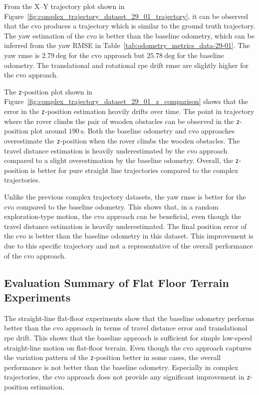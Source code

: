 \documentclass[report.tex]{subfiles}
\begin{document}
    From the X--Y trajectory plot shown in Figure~\ref{fig:complex_trajectory_dataset_29_01_trajectory}, it can be observed that the \gls{cvo} produces a trajectory which is similar to the ground truth trajectory. The yaw estimation of the \gls{cvo} is better than the baseline odometry, which can be inferred from the yaw RMSE in Table~\ref{tab:odometry_metrics_data-29-01}. The yaw \gls{rmse} is $2.79~\mathrm{deg}$ for the \gls{cvo} approach but $25.78~\mathrm{deg}$ for the baseline odometry. The translational and rotational \gls{rpe} drift \gls{rmse} are slightly higher for the \gls{cvo} approach.

    The \texttt{z}-position plot shown in Figure~\ref{fig:complex_trajectory_dataset_29_01_z_comparison} shows that the error in the \texttt{z}-position estimation heavily drifts over time. The point in trajectory where the rover climbs the pair of wooden obstacles can be observed in the \texttt{z}-position plot around $190~\mathrm{s}$. Both the baseline odometry and \gls{cvo} approaches overestimate the \texttt{z}-position when the rover climbs the wooden obstacles. The travel distance estimation is heavily underestimated by the \gls{cvo} approach compared to a slight overestimation by the baseline odometry. Overall, the \texttt{z}-position is better for pure straight line trajectories compared to the complex trajectories.

    Unlike the previous complex trajectory datasets, the yaw \gls{rmse} is better for the \gls{cvo} compared to the baseline odometry. This shows that, in a random exploration-type motion, the \gls{cvo} approach can be beneficial, even though the travel distance estimation is heavily underestimated. The final position error of the \gls{cvo} is better than the baseline odometry in this dataset. This improvement is due to this specific trajectory and not a representative of the overall performance of the \gls{cvo} approach. 
    \FloatBarrier
  
    \subsection{Evaluation Summary of Flat Floor Terrain Experiments} \label{subsec:flatFloorEvalSummary}
    
    The straight-line flat-floor experiments show that the baseline odometry performs better than the \gls{cvo} approach in terms of travel distance error and translational \gls{rpe} drift. This shows that the baseline approach is sufficient for simple low-speed straight-line motion on flat-floor terrain. Even though the \gls{cvo} approach captures the variation pattern of the \texttt{z}-position better in some cases, the overall performance is not better than the baseline odometry. Especially in complex trajectories, the \gls{cvo} approach does not provide any significant improvement in \texttt{z}-position estimation. 
\end{document}
